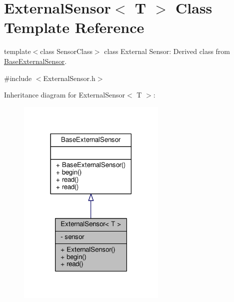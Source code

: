 \hypertarget{class_external_sensor}{}\section{External\+Sensor$<$ T $>$ Class Template Reference}
\label{class_external_sensor}


template$<$class Sensor\+Class$>$ class External Sensor\+: Derived class from \hyperlink{class_base_external_sensor}{Base\+External\+Sensor}.  




{\ttfamily \#include $<$External\+Sensor.\+h$>$}



Inheritance diagram for External\+Sensor$<$ T $>$\+:\nopagebreak
\begin{figure}[H]
\begin{center}
\leavevmode
\includegraphics[width=201pt]{df/d93/class_external_sensor__inherit__graph}
\end{center}
\end{figure}



